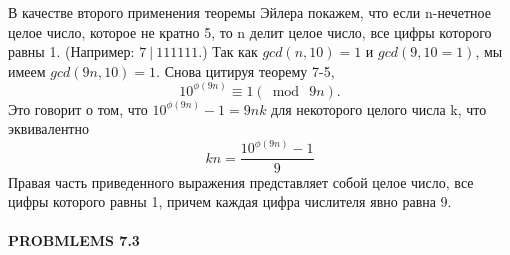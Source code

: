 \documentclass[11pt, leqno]{article}
\begin{document}
\qquad В качестве второго применения теоремы Эйлера покажем, что если n-нечетное целое число, которое не кратно 5, то n делит целое число, все цифры которого равны 1. (Например: $7\ |\ 111111$.) Так как $gcd(n, 10) = 1$ и $gcd(9, 10 = 1)$, мы имеем $gcd(9n, 10) = 1$. Снова цитируя теорему 7-5,
\[10^{\phi(9n)} \equiv 1 (\bmod\ 9n).\]
Это говорит о том, что $10^{\phi(9n)} - 1 = 9nk$ для некоторого целого числа k, что эквивалентно
\[kn = \frac{10^{\phi(9n)} - 1}{9}\]
Правая часть приведенного выражения представляет собой целое число, все цифры которого равны 1, причем каждая цифра числителя явно равна 9.

\begin{center}
	\item \paragraph{PROBMLEMS 7.3}
\end{center}
\end{document}
